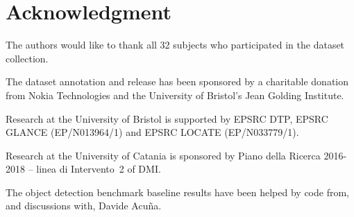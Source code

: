 \documentclass[runningheads]{llncs}
\begin{document}
  \section*{Acknowledgment}
  
The authors would like to thank all 32 subjects who participated in the dataset collection. 

\noindent The dataset annotation and release has been sponsored by a charitable donation from Nokia Technologies and the University of Bristol's Jean Golding Institute. 

\noindent Research at the University of Bristol is supported by EPSRC DTP, EPSRC GLANCE (EP/N013964/1) and EPSRC LOCATE (EP/N033779/1).

\noindent Research at the University of Catania is sponsored by Piano della Ricerca 2016-2018 – linea di Intervento~2 of DMI. 

\noindent The object detection benchmark baseline results have been helped by code from, and discussions with, Davide Acu{\~{n}}a.
\end{document}
